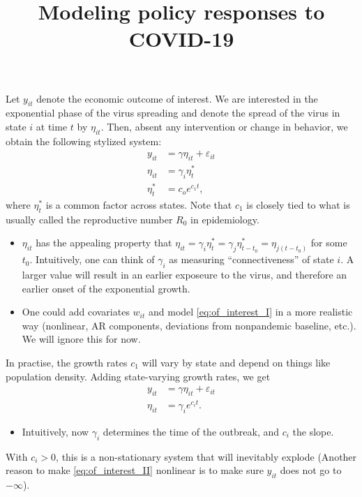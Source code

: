 \documentclass{article}[12pt]
\title{Modeling policy responses to COVID-19}
\date{}
\begin{document}
\maketitle
Let $y_{it}$ denote the economic outcome of interest. We are interested in the exponential phase of the virus spreading and denote the spread of the virus in state $i$ at time $t$ by $\eta_{it}$. Then, absent any intervention or change in behavior, we obtain the following stylized system:
\begin{align}
y_{it} &= \gamma \eta_{it} + \varepsilon_{it} \label{eq:of_interest_I}\\
\eta_{it}&=\gamma_{i} \eta^*_{t} \\ 
\eta^*_t &= c_o e^{c_1 t},
\end{align}
where $\eta^*_t$ is a common factor across states. Note that $c_1$ is closely tied to what is usually called the reproductive number $R_0$ in epidemiology.
\begin{itemize}
\item $\eta_{it}$ has the appealing property that $\eta_{it} = \gamma_{i} \eta^*_{t}  = \gamma_{j} \eta^*_{t-t_0} = \eta_{j(t-t_0)}$ for some $t_0$. Intuitively, one can think of $\gamma_i$ as measuring ``connectiveness'' of state $i$. A larger value will result in an earlier exposeure to the virus, and therefore an earlier onset of the exponential growth.
\item One could add covariates $w_{it}$ and model \eqref{eq:of_interest_I} in a more realistic way (nonlinear, AR components, deviations from nonpandemic baseline, etc.). We will ignore this for now.
\end{itemize}

In practise, the growth rates $c_1$ will vary by state and depend on things like population density. Adding state-varying growth rates, we get
\begin{align}
y_{it} &= \gamma \eta_{it} + \varepsilon_{it} \label{eq:of_interest_II}\\
\eta_{it}&=\gamma_{i} e^{c_i t}.
\end{align}
\begin{itemize}
\item Intuitively, now $\gamma_i$ determines the time of the outbreak, and $c_i$ the slope.
\end{itemize}

With $c_i>0$, this is a non-stationary system that will inevitably explode (Another reason to make \eqref{eq:of_interest_II} nonlinear is to make sure $y_{it}$ does not go to $-\infty$). 
\end{document}
